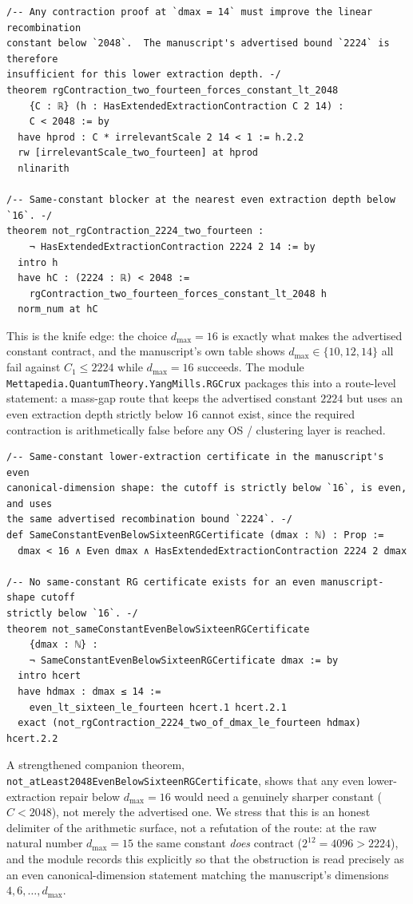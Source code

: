 \documentclass[11pt]{article}
\theoremstyle{definition}
\newcommand{\dmax}{d_{\max}}
\begin{document}
\begin{lstlisting}
/-- Any contraction proof at `dmax = 14` must improve the linear recombination
constant below `2048`.  The manuscript's advertised bound `2224` is therefore
insufficient for this lower extraction depth. -/
theorem rgContraction_two_fourteen_forces_constant_lt_2048
    {C : ℝ} (h : HasExtendedExtractionContraction C 2 14) :
    C < 2048 := by
  have hprod : C * irrelevantScale 2 14 < 1 := h.2.2
  rw [irrelevantScale_two_fourteen] at hprod
  nlinarith

/-- Same-constant blocker at the nearest even extraction depth below `16`. -/
theorem not_rgContraction_2224_two_fourteen :
    ¬ HasExtendedExtractionContraction 2224 2 14 := by
  intro h
  have hC : (2224 : ℝ) < 2048 :=
    rgContraction_two_fourteen_forces_constant_lt_2048 h
  norm_num at hC
\end{lstlisting}

This is the knife edge: the choice $\dmax=16$ is exactly what makes the
advertised constant contract, and the manuscript's own table shows
$\dmax\in\{10,12,14\}$ all fail against $C_1\leq 2224$ while $\dmax=16$ succeeds.
The module \texttt{Mettapedia.QuantumTheory.YangMills.RGCrux} packages this into
a route-level statement: a mass-gap route that keeps the advertised constant
$2224$ but uses an even extraction depth strictly below $16$ cannot exist, since
the required contraction is arithmetically false before any OS / clustering
layer is reached.

\begin{lstlisting}
/-- Same-constant lower-extraction certificate in the manuscript's even
canonical-dimension shape: the cutoff is strictly below `16`, is even, and uses
the same advertised recombination bound `2224`. -/
def SameConstantEvenBelowSixteenRGCertificate (dmax : ℕ) : Prop :=
  dmax < 16 ∧ Even dmax ∧ HasExtendedExtractionContraction 2224 2 dmax

/-- No same-constant RG certificate exists for an even manuscript-shape cutoff
strictly below `16`. -/
theorem not_sameConstantEvenBelowSixteenRGCertificate
    {dmax : ℕ} :
    ¬ SameConstantEvenBelowSixteenRGCertificate dmax := by
  intro hcert
  have hdmax : dmax ≤ 14 :=
    even_lt_sixteen_le_fourteen hcert.1 hcert.2.1
  exact (not_rgContraction_2224_two_of_dmax_le_fourteen hdmax) hcert.2.2
\end{lstlisting}

A strengthened companion theorem,
\texttt{not\_atLeast2048EvenBelowSixteenRGCertificate}, shows that any even
lower-extraction repair below $\dmax=16$ would need a genuinely sharper constant
($C<2048$), not merely the advertised one. We stress that this is an honest
delimiter of the arithmetic surface, not a refutation of the route: at the raw
natural number $\dmax=15$ the same constant \emph{does} contract
($2^{12}=4096>2224$), and the module records this explicitly so that the
obstruction is read precisely as an even canonical-dimension statement matching
the manuscript's dimensions $4,6,\dots,\dmax$.
\end{document}
